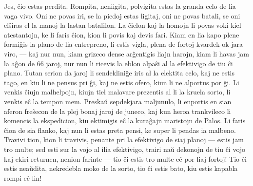    Jes, \^cio estas perdita. Rompita, neniigita, polvigita estas la
granda celo de lia vaga vivo. Oni ne povas iri, se la piedoj estas
ligitaj, oni ne povas batali, se oni el\^siras el la manoj la lastan
batalilon. La \^cielon kaj la homojn li povas voki kiel atestantojn,
ke li faris \^cion, kion li povis kaj devis fari. Kiam en lia kapo
plene formi\^gis la plano de lia entrepreno, li estis vigla, plena
de fortoj kvardek-ok-jara viro, --- kaj nur nun, kiam grizeco dense
ar\^gentigis liajn harojn, kiam li havas jam la a\^gon de 66 jaroj,
nur nun li ricevis la eblon alpa\^si al la efektivigo de tiu \^ci
plano. Tutan serion da jaroj li sendeklini\^ge iris al la elektita
celo, kaj ne estis tago, en kiu li ne pensus pri \^gi, kaj ne estis
ofero, kiun li ne alportus por \^gi. Li venkis \^ciujn malhelpojn,
kiujn tiel malavare prezentis al li la kruela sorto, li venkis e\^c
la tempon mem. Preska\u u sepdekjara maljunulo, li enportis en sian
aferon fre\^secon de la plej bonaj jaroj de juneco, kaj kun heroa
trankvileco li komencis la ekspedicion, kiu ektimigis e\^c la
kura\^gajn maristojn de Palos. Li faris \^cion de sia flanko, kaj
nun li estas preta pensi, ke super li pendas ia malbeno. Travivi
tion, kion li travivis, penante pri la efektivigo de siaj planoj
 --- estis jam tro multe; sed esti sur la vojo al ilia efektivigo,
trairi na\u u dekonojn de tiu \^ci vojo kaj ekiri returnen, nenion
farinte --- tio \^ci estis tro multe e\^c por liaj fortoj! Tio \^ci
estis nea\u udita, nekredebla moko de la sorto, tio \^ci estis bato,
kiu estis kapabla rompi e\^c lin!

